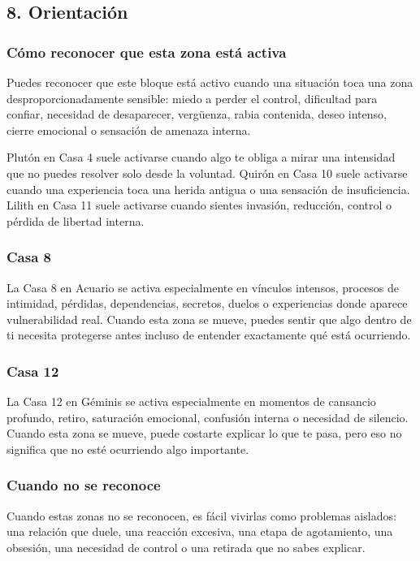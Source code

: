 \documentclass[11pt,a4paper]{article}
\begin{document}
\subsection{8. Orientación}

\subsubsection*{Cómo reconocer que esta zona está activa}
Puedes reconocer que este bloque está activo cuando una situación toca una zona desproporcionadamente sensible: miedo a perder el control, dificultad para confiar, necesidad de desaparecer, vergüenza, rabia contenida, deseo intenso, cierre emocional o sensación de amenaza interna.

Plutón en Casa 4 suele activarse cuando algo te obliga a mirar una intensidad que no puedes resolver solo desde la voluntad. Quirón en Casa 10 suele activarse cuando una experiencia toca una herida antigua o una sensación de insuficiencia. Lilith en Casa 11 suele activarse cuando sientes invasión, reducción, control o pérdida de libertad interna.

\subsubsection*{Casa 8}
La Casa 8 en Acuario se activa especialmente en vínculos intensos, procesos de intimidad, pérdidas, dependencias, secretos, duelos o experiencias donde aparece vulnerabilidad real. Cuando esta zona se mueve, puedes sentir que algo dentro de ti necesita protegerse antes incluso de entender exactamente qué está ocurriendo.

\subsubsection*{Casa 12}
La Casa 12 en Géminis se activa especialmente en momentos de cansancio profundo, retiro, saturación emocional, confusión interna o necesidad de silencio. Cuando esta zona se mueve, puede costarte explicar lo que te pasa, pero eso no significa que no esté ocurriendo algo importante.

\subsubsection*{Cuando no se reconoce}
Cuando estas zonas no se reconocen, es fácil vivirlas como problemas aislados: una relación que duele, una reacción excesiva, una etapa de agotamiento, una obsesión, una necesidad de control o una retirada que no sabes explicar.
\end{document}
